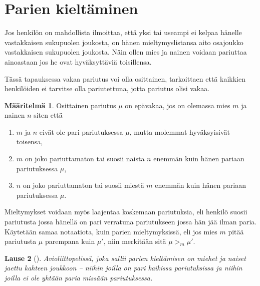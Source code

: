 \documentclass[finnish]{tktltiki2}
\newtheorem{lau}{Lause}
\theoremstyle{definition}
\newtheorem{maar}[lau]{Määritelmä}
\theoremstyle{remark}
\begin{document}
\section{Parien kieltäminen}
Jos henkilön on mahdollista ilmoittaa, että yksi tai useampi ei kelpaa hänelle vastakkaisen sukupuolen joukosta, on hänen mieltymyslistansa aito osajoukko vastakkaisen sukupuolen joukosta. Näin ollen mies ja nainen voidaan pariuttaa ainoastaan jos he ovat hyväksyttäviä toisillensa.

Tässä tapauksessa vakaa pariutus voi olla osittainen, tarkoittaen että kaikkien henkilöiden ei tarvitse olla pariutettuna, jotta pariutus olisi vakaa.

\begin{maar}
Osittainen pariutus $\mu$ on epävakaa, jos on olemassa mies $m$ ja nainen $n$ siten että
\begin{enumerate}
	\item $m$ ja $n$ eivät ole pari pariutuksessa $\mu$, mutta molemmat hyväksyisivät toisensa,
	\item $m$ on joko pariuttamaton tai suosii naista $n$ enemmän kuin hänen pariaan pariutuksessa $\mu$,
	\item $n$ on joko pariuttamaton tai suosii miestä $m$ enemmän kuin hänen pariaan pariutuksessa $\mu$.
\end{enumerate} 
\end{maar}

Mieltymykset voidaan myös laajentaa koskemaan pariutuksia, eli henkilö suosii pariutusta jossa hänellä on pari verratuna pariutukseen jossa hän jää ilman paria. Käytetään samaa notaatiota, kuin parien mieltymyksissä, eli jos mies $m$ pitää pariutusta $\mu$ parempana kuin $\mu'$, niin merkitään sitä $\mu >_m \mu'$.

\begin{lau}[\cite{gusfield1989stable}]
Avioliittopelissä, joka sallii parien kieltämisen on miehet ja naiset jaettu kahteen joukkoon -- niihin joilla on pari kaikissa pariutuksissa ja niihin joilla ei ole yhtään paria missään pariutuksessa.
\end{lau}
\end{document}
